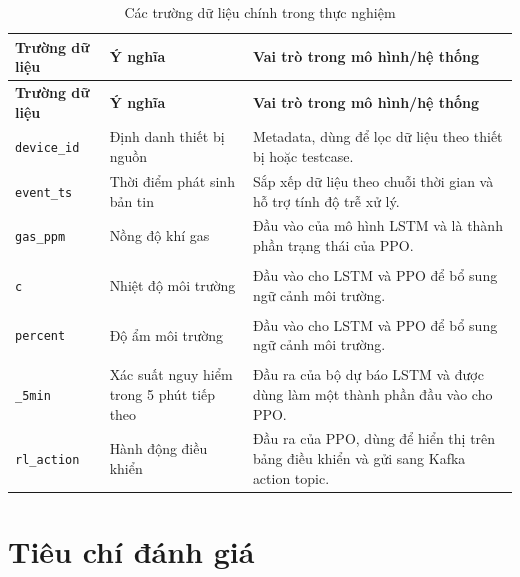 \begin{longtable}{
  >{\raggedright\arraybackslash}p{3.0cm}
  >{\raggedright\arraybackslash}p{3.5cm}
  >{\raggedright\arraybackslash}p{\dimexpr\textwidth-6.5cm-6\tabcolsep\relax}
}
\caption{Các trường dữ liệu chính trong thực nghiệm}
\label{tab:data_fields} \\
\toprule
\textbf{Trường dữ liệu} 
& \textbf{Ý nghĩa} 
& \textbf{Vai trò trong mô hình/hệ thống} \\
\midrule
\endfirsthead
\toprule
\textbf{Trường dữ liệu} 
& \textbf{Ý nghĩa} 
& \textbf{Vai trò trong mô hình/hệ thống} \\
\midrule
\endhead
\endfoot
\bottomrule
\endlastfoot

\texttt{device\_id} 
& Định danh thiết bị nguồn 
& Metadata, dùng để lọc dữ liệu theo thiết bị hoặc testcase. \\

\texttt{event\_ts} 
& Thời điểm phát sinh bản tin 
& Sắp xếp dữ liệu theo chuỗi thời gian và hỗ trợ tính độ trễ xử lý. \\

\texttt{gas\_ppm} 
& Nồng độ khí gas 
& Đầu vào của mô hình LSTM và là thành phần trạng thái của PPO. \\

\makecell[l]{\texttt{temperature\_}\\\texttt{c}}
& Nhiệt độ môi trường 
& Đầu vào cho LSTM và PPO để bổ sung ngữ cảnh môi trường. \\

\makecell[l]{\texttt{humidity\_}\\\texttt{percent}}
& Độ ẩm môi trường 
& Đầu vào cho LSTM và PPO để bổ sung ngữ cảnh môi trường. \\

\makecell[l]{\texttt{predicted\_risk}\\\texttt{\_5min}}
& Xác suất nguy hiểm trong 5 phút tiếp theo 
& Đầu ra của bộ dự báo LSTM và được dùng làm một thành phần đầu vào cho PPO. \\

\texttt{rl\_action} 
& Hành động điều khiển 
& Đầu ra của PPO, dùng để hiển thị trên bảng điều khiển và gửi sang Kafka action topic. \\

\end{longtable}
\endgroup

\section{Tiêu chí đánh giá}

